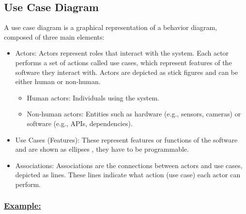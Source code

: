 \subsection{Use Case Diagram}
A use case diagram is a graphical representation of a behavior diagram, composed of three main elements:

\begin{itemize} 
    \item Actors: Actors represent roles that interact with the system. Each actor performs a set of 
actions called use cases, which represent features of the software they interact with. Actors are
depicted as stick figures and can be either human or non-human.
   \begin{itemize}
    \item Human actors: Individuals using the system.
    \item Non-human actors: Entities such as hardware (e.g., sensors, cameras) 
     or software (e.g., APIs, dependencies). 
   \end{itemize}
   \item Use Cases (Features): These represent features or functions of the software and are shown as ellipses , they have to be programmable.
   \item Associations: Associations are the connections between actors and use cases, depicted as lines. These lines 
indicate what action (use case) each actor can perform. 
\end{itemize}

\vspace{0.5cm}
\subsubsection*{\underline{Example:}}

